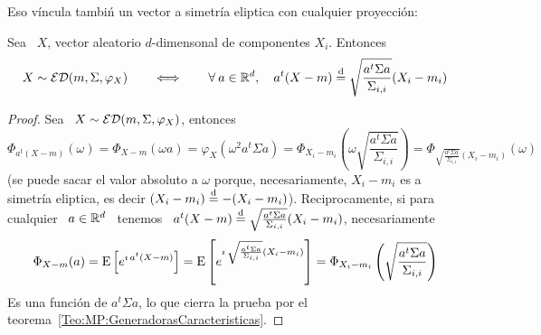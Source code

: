 Eso  v\'incula   tambi\'n  un  vector  a  simetr\'ia   eliptica  con  cualquier
proyecci\'on:
%
\begin{teorema}
  Sea \ $X$, vector aleatorio $d$-dimensonal de componentes $X_i$. Entonces
  \[
  X \sim \mathcal{ED}(m,\Sigma,\varphi_X) \qquad  \Longleftrightarrow \qquad \forall \: a
  \in \mathbb{R}^d, \quad a^t (X - m) \stackrel{\mathrm{d}}{=} \sqrt{\frac{a^t \Sigma a}{\Sigma_{i,i}}}
  (X_i - m_i)
  \]
\end{teorema}
%
\begin{proof}
  Sea \ $X \sim \mathcal{ED}(m,\Sigma,\varphi_X)$, entonces
  \[
  \Phi_{a^t (X - m)}(\omega) = \Phi_{X - m}(\omega a) = \varphi_X\left( \omega^2
    a^t \Sigma  a \right)  = \Phi_{X_i-m_i}\left( \omega  \sqrt{\frac{a^t \Sigma
        a}{\Sigma_{i,i}}}\right)  = \Phi_{\sqrt{\frac{a^t \Sigma
        a}{\Sigma_{i,i}}} (X_i-m_i)}\left( \omega  \right)
  \]
  (se puede sacar el valor absoluto a $\omega$ porque, necesariamente, $X_i-m_i$
  es     a     simetr\'ia    eliptica,     es     decir    $(X_i-m_i)     \stackrel{\mathrm{d}}{=}
  -(X_i-m_i)$). Reciprocamente, si para cualquier  \ $a \in \mathbb{R}^d$ \ tenemos \
  $a^t (X  - m)  \stackrel{\mathrm{d}}{=} \sqrt{\frac{a^t \Sigma  a}{\Sigma_{i,i}}} (X_i  - m_i)$,
  necesariamente
  \[
  \Phi_{X  - m}(a) =  \operatorname{E}\left[ e^{\imath  \, a^t  (X-m)} \right]  = \operatorname{E}\left[
    e^{\imath \, \sqrt{\frac{a^t \Sigma a}{\Sigma_{i,i}}} (X_i - m_i)} \right] =
  \Phi_{X_i-m_i}\left( \sqrt{\frac{a^t \Sigma a}{\Sigma_{i,i}}}\right)
  \]
  Es  una  funci\'on  de  $a^t  \Sigma  a$,  lo que  cierra  la  prueba  por  el
  teorema~\ref{Teo:MP:GeneradorasCaracteristicas}.
\end{proof}

